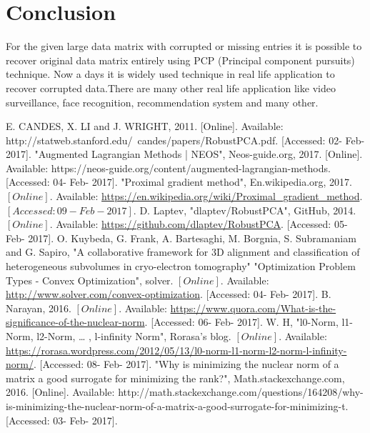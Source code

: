 \documentclass[journal, a4paper]{IEEEtran}
\begin{document}
\section{Conclusion}
	
	For the given large data matrix with corrupted or missing entries it is possible to recover original data matrix entirely using PCP (Principal component pursuits) technique. Now a days it is widely used technique in real life application to recover corrupted data.There are many other real life application like video surveillance, face recognition, recommendation system and many other.
\begin{thebibliography}{9}
	E. CANDES, X. LI and J. WRIGHT, 2011. [Online]. Available: http://statweb.stanford.edu/~candes/papers/RobustPCA.pdf. [Accessed: 02- Feb- 2017].
	"Augmented Lagrangian Methods | NEOS", Neos-guide.org, 2017. [Online]. Available: https://neos-guide.org/content/augmented-lagrangian-methods. [Accessed: 04- Feb- 2017].
	"Proximal gradient method", En.wikipedia.org, 2017. $[Online]$. Available: \url{https://en.wikipedia.org/wiki/Proximal_gradient_method}. $[Accessed: 09- Feb- 2017]$.
	D. Laptev, "dlaptev/RobustPCA", GitHub, 2014. $[Online]$. Available: \url{https://github.com/dlaptev/RobustPCA}. [Accessed: 05- Feb- 2017].
	O. Kuybeda, G. Frank, A. Bartesaghi, M. Borgnia, S. Subramaniam and G. Sapiro, "A collaborative framework for 3D alignment and classification of heterogeneous subvolumes in cryo-electron tomography"
	"Optimization Problem Types - Convex Optimization", solver. $[Online]$. Available: \url{http://www.solver.com/convex-optimization}. [Accessed: 04- Feb- 2017].
	B. Narayan, 2016. $[Online]$. Available: \url{https://www.quora.com/What-is-the-significance-of-the-nuclear-norm}. [Accessed: 06- Feb- 2017].
	W. H, "l0-Norm, l1-Norm, l2-Norm, … , l-infinity Norm", Rorasa's blog. $[Online]$. Available: \url{https://rorasa.wordpress.com/2012/05/13/l0-norm-l1-norm-l2-norm-l-infinity-norm/}. [Accessed: 08- Feb- 2017].
	"Why is minimizing the nuclear norm of a matrix a good surrogate for minimizing the rank?", Math.stackexchange.com, 2016. [Online]. Available: http://math.stackexchange.com/questions/164208/why-is-minimizing-the-nuclear-norm-of-a-matrix-a-good-surrogate-for-minimizing-t. [Accessed: 03- Feb- 2017].
	
\end{thebibliography}



\end{document}
